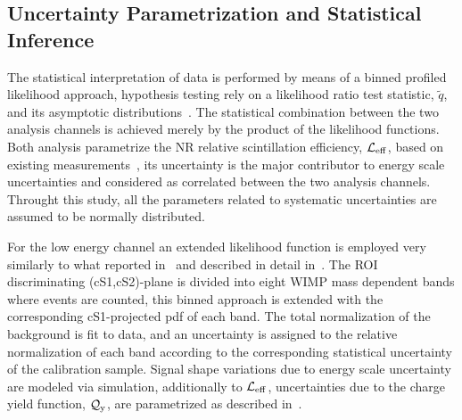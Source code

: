
\subsection{Uncertainty Parametrization and Statistical Inference }
\label{sec:LikelihoodFunction}
The statistical interpretation of data is performed by means of a binned profiled likelihood approach, hypothesis testing rely on a likelihood ratio test statistic, $\tilde{q}$, 
and its asymptotic distributions~\cite{asympt}. The statistical combination between the two analysis channels is achieved merely by the product of the likelihood functions.
Both analysis parametrize the NR relative scintillation efficiency, $\mathcal{L}_{\mathrm{eff}}$, based on existing measurements~\cite{run8Result}, its uncertainty is the major contributor to energy 
scale uncertainties and considered as correlated between the two analysis channels.
Throught this study, all the parameters related to systematic uncertainties are assumed to be normally distributed.

For the low energy channel an extended likelihood function is employed very similarly to what reported in~\cite{Aprile:2011hx} and described in detail in~\cite{xe100_run_combination}. 
The ROI discriminating (cS1,cS2)-plane is divided into eight WIMP mass dependent bands where events are counted, this binned approach is extended with the corresponding cS1-projected pdf of each band. The total normalization of the background is fit to data, and an uncertainty  is assigned to the relative normalization 
of each band according to the corresponding statistical uncertainty of the calibration sample.
Signal shape variations due to energy scale uncertainty are modeled via simulation, additionally to $\mathcal{L}_{\mathrm{eff}}$, uncertainties due to the charge 
yield function, $\mathcal{Q}_{\mathrm{y}}$, are parametrized as described in~\cite{QY}.

